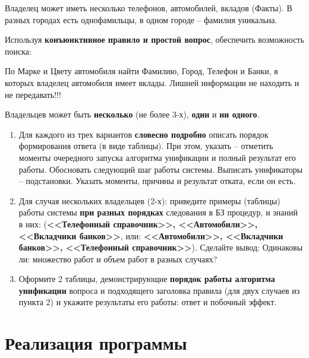 \documentclass[a4paper,12pt]{article}
\begin{document}
	Владелец может иметь несколько телефонов, автомобилей, вкладов (Факты). В разных городах есть однофамильцы, в одном городе – фамилия уникальна.
	
	Используя {\bf конъюнктивное правило и простой вопрос}, обеспечить возможность поиска:
	
	По Марке и Цвету автомобиля найти Фамилию, Город, Телефон и Банки, в которых владелец автомобиля имеет вклады. Лишней информации не находить и не передавать!!!
	
	Владельцев может быть {\bf несколько} (не более 3-х), {\bf один} и {\bf ни одного}.
	\begin{enumerate}
		\item Для каждого из трех вариантов {\bf словесно подробно} описать порядок формирования ответа (в виде таблицы). При этом, указать – отметить моменты очередного запуска алгоритма унификации и полный результат его работы. Обосновать следующий шаг работы системы. Выписать унификаторы – подстановки. Указать моменты, причины и результат отката, если он есть.
		\item Для случая нескольких владельцев (2-х): 
		приведите примеры (таблицы) работы системы {\bf при разных порядках} следования в БЗ  процедур, и знаний в них: ({\bf <<Телефонный справочник>>, <<Автомобили>>, <<Вкладчики банков>>}, или: {\bf <<Автомобили>>, <<Вкладчики банков>>, <<Телефонный справочник>>}). Сделайте вывод: Одинаковы ли: множество работ и объем работ в разных случаях?
		\item Оформите 2 таблицы, демонстрирующие {\bf порядок работы алгоритма унификации} вопроса и подходящего заголовка правила (для двух случаев из пункта 2) и укажите результаты его работы: ответ и побочный эффект.

	\end{enumerate}

	\newpage

	\section*{Реализация программы}
	
\end{document}
